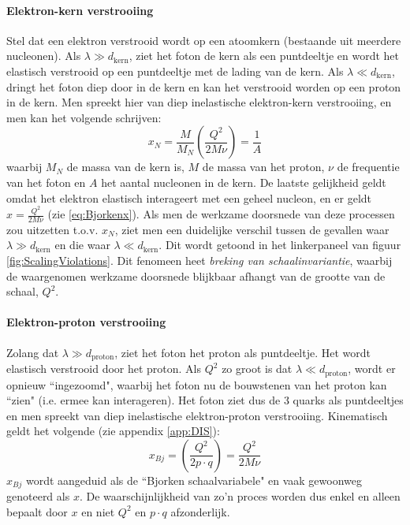 \documentclass[a4paper,11pt]{article}
\numberwithin{equation}{section} %
\begin{document}
    \paragraph{Elektron-kern verstrooiing}
Stel dat een elektron verstrooid wordt op een atoomkern (bestaande uit meerdere nucleonen).
Als $\lambda \gg d_\text{kern}$, ziet het foton de kern als een puntdeeltje en wordt het elastisch verstrooid op een puntdeeltje met de lading van de kern.
Als $\lambda \ll d_\text{kern}$, dringt het foton diep door in de kern en kan het verstrooid worden op een proton in de kern.
Men spreekt hier van diep inelastische elektron-kern verstrooiing, en men kan het volgende schrijven:
\begin{equation}
x_N = \frac{M}{M_N} \left( \frac{Q^2}{2M\nu} \right) = \frac{1}{A}
\end{equation}
waarbij $M_N$ de massa van de kern is, $M$ de massa van het proton, $\nu$ de frequentie van het foton en $A$ het aantal nucleonen in de kern.
De laatste gelijkheid geldt omdat het elektron elastisch interageert met een geheel nucleon, en er geldt $x = \frac{Q^2}{2M\nu}$ (zie \eqref{eq:Bjorkenx}).
Als men de werkzame doorsnede van deze processen zou uitzetten t.o.v. $x_N$, ziet men een duidelijke verschil tussen de gevallen waar $\lambda \gg d_\text{kern}$ en die waar $\lambda \ll d_\text{kern}$.
Dit wordt getoond in het linkerpaneel van figuur \ref{fig:ScalingViolations}.
Dit fenomeen heet \textit{breking van schaalinvariantie}, waarbij de waargenomen werkzame doorsnede blijkbaar afhangt van de grootte van de schaal, $Q^2$.

      \paragraph{Elektron-proton verstrooiing}
Zolang dat $\lambda \gg d_\text{proton}$, ziet het foton het proton als puntdeeltje. Het wordt elastisch verstrooid door het proton.
Als $Q^2$ zo groot is dat $\lambda \ll d_\text{proton}$, wordt er opnieuw ``ingezoomd", waarbij het foton nu de bouwstenen van het proton kan “zien" (i.e. ermee kan interageren).
Het foton ziet dus de 3 quarks als puntdeeltjes en men spreekt van diep inelastische elektron-proton verstrooiing.
Kinematisch geldt het volgende (zie appendix \ref{app:DIS}):
\begin{equation} \label{eq:Bjorkenx}
x_{Bj} = \left( \frac{Q^2}{2p\cdot q} \right) = \frac{Q^2}{2M\nu}
\end{equation}
$x_{Bj}$ wordt aangeduid als de “Bjorken schaalvariabele" en vaak gewoonweg genoteerd als $x$.
De waarschijnlijkheid van zo'n proces worden dus enkel en alleen bepaalt door $x$ en niet $Q^2$ en $p\cdot q$ afzonderlijk.
\end{document}
